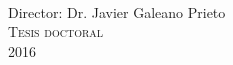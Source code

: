 \documentclass[
11pt, %
spanish, %
onehalfspacing, %
]{MastersDoctoralThesis_custom} %
\begin{document}
\begin{titlepage}
\begin{center}
{\Large \authorname}\\[1cm]
\Large{{Director: }{Dr. Javier Galeano Prieto}}\\[1cm]
\textsc{\Large Tesis doctoral}\\[0.5cm] %
{\large 2016}\\[4cm] %
 
\vfill
\end{center}
\end{titlepage}


%
%
% 
% 
%
\end{document}
